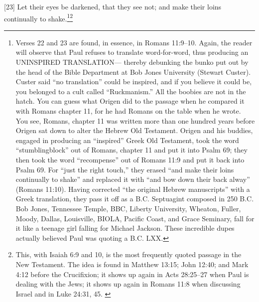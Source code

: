 [23] \textcolor[rgb]{0.00,0.00,1.00}{Let their eyes be darkened, that they see not; and make their loins continually to shake.}\footnote{Verses 22 and 23 are found, in essence, in
Romans 11:9–10. Again, the reader will observe
that Paul refuses to translate word-for-word, thus
producing an UNINSPIRED TRANSLATION—
thereby debunking the bunko put out by the head
of the Bible Department at Bob Jones University
(Stewart Custer). Custer said “no translation”
could be inspired, and if you believe it could be,
you belonged to a cult called “Ruckmanism.” All
the boobies are not in the hatch.
You can guess what Origen did to the passage
when he compared it with Romans chapter 11, for
he had Romans on the table when he wrote. You
see, Romans, chapter 11 was written more than
one hundred years before Origen sat down to alter
the Hebrew Old Testament. Origen and his
buddies, engaged in producing an “inspired”
Greek Old Testament, took the word
“stumblingblock” out of Romans, chapter 11
and put it into Psalm 69; they then took the word
“recompense” out of Romans 11:9 and put it
back into Psalm 69. For “just the right touch,”
they erased “and make their loins continually to
shake” and replaced it with “and bow down
their back alway” (Romans 11:10). Having
corrected “the original Hebrew manuscripts” with
a Greek translation, they pass it off as a B.C.
Septuagint composed in 250 B.C. Bob Jones,
Tennessee Temple, BBC, Liberty University,
Wheaton, Fuller, Moody, Dallas, Louisville,
BIOLA, Pacific Coast, and Grace Seminary, fall
for it like a teenage girl falling for Michael
Jackson. These incredible dupes actually believed
Paul was quoting a B.C. LXX. }\footnote{This, with Isaiah 6:9 and 10, is the
most frequently quoted passage in the New
Testament. The idea is found in Matthew 13:15;
John 12:40; and Mark 4:12 before the
Crucifixion; it shows up again in Acts 28:25–27
when Paul is dealing with the Jews; it shows up
again in Romans 11:8 when discussing Israel and
in Luke 24:31, 45. \cite{Ruckman1992Psalms}  }
